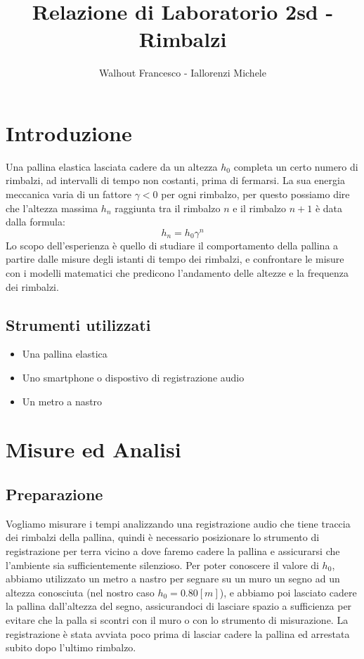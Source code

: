 \documentclass[a4paper]{article}
\title{Relazione di Laboratorio 2sd - Rimbalzi}
\author{Walhout Francesco - Iallorenzi Michele}
\begin{document}
    \maketitle

    \section{Introduzione}
    Una pallina elastica lasciata cadere da un altezza $h_0$ completa un certo numero di rimbalzi, ad intervalli di tempo non costanti, prima di fermarsi.
    La sua energia meccanica varia di un fattore $ \gamma<0$ per ogni rimbalzo,
    per questo possiamo dire che l'altezza massima  $h_n$ raggiunta tra il rimbalzo
    $n$ e il rimbalzo $n+1$ è  data dalla formula:
    \begin{equation}
        \label{eq:altezza 1}
        h_n=h_0 \gamma^{n}
    \end{equation}
    Lo scopo dell'esperienza è quello di studiare il comportamento della pallina a partire
    dalle misure degli istanti di tempo dei rimbalzi, e confrontare le misure con i modelli
    matematici che predicono l'andamento delle altezze e la frequenza dei rimbalzi.

    \subsection{Strumenti utilizzati}
    \begin{itemize}
        \item Una pallina elastica
        \item Uno smartphone o dispostivo di registrazione audio
        \item Un metro a nastro
    \end{itemize}

    \section{Misure ed Analisi}
    
    \subsection{Preparazione}
    Vogliamo misurare i tempi analizzando una registrazione audio che tiene traccia dei rimbalzi della pallina,
    quindi è necessario posizionare lo strumento di registrazione per terra vicino
    a dove faremo cadere la pallina e assicurarsi che l'ambiente sia sufficientemente silenzioso.
    Per poter conoscere il valore di $h_0$, abbiamo utilizzato un metro a nastro per
    segnare su un muro un segno ad un altezza conosciuta (nel nostro caso $h_0 = 0.80 [m]$), e abbiamo poi lasciato cadere
    la pallina dall'altezza del segno, assicurandoci di lasciare spazio a sufficienza per evitare
    che la palla si scontri con il muro o con lo strumento di misurazione.
    La registrazione è stata avviata poco prima di lasciar cadere la pallina ed arrestata subito dopo l'ultimo rimbalzo.
\end{document}
